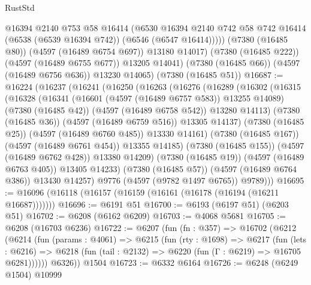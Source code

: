 \begin{lexlean}{RustStd}
\begin{coremodule}
              @16394
              @2140
              @753
              @58
              @16414
              (@6530
                @16394
                @2140
                @742
                @58
                @742
                @16414
                (@6538 (@6539 @16394 @742))
                (@6546 (@6547 @16414)))))
          (@7380 (@16485 @80))
          (@4597 (@16489 @6754 @697))
          @13180
          @14017)
        (@7380 (@16485 @222))
        (@4597 (@16489 @6755 @677))
        @13205
        @14041)
      (@7380 (@16485 @66))
      (@4597 (@16489 @6756 @636))
      @13230
      @14065)
    (@7380 (@16485 @51))
@16687 := @16224
    (@16237
      (@16241
        (@16250
          (@16263
            (@16276
              (@16289
                (@16302
                  (@16315
                    (@16328
                      (@16341
                        (@16601 (@4597 (@16489 @6757 @583)) @13255 @14089)
                        (@7380 (@16485 @42))
                        (@4597 (@16489 @6758 @542))
                        @13280
                        @14113)
                      (@7380 (@16485 @36))
                      (@4597 (@16489 @6759 @516))
                      @13305
                      @14137)
                    (@7380 (@16485 @25))
                    (@4597 (@16489 @6760 @485))
                    @13330
                    @14161)
                  (@7380 (@16485 @167))
                  (@4597 (@16489 @6761 @454))
                  @13355
                  @14185)
                (@7380 (@16485 @155))
                (@4597 (@16489 @6762 @428))
                @13380
                @14209)
              (@7380 (@16485 @19))
              (@4597 (@16489 @6763 @405))
              @13405
              @14233)
            (@7380 (@16485 @57))
            (@4597 (@16489 @6764 @386))
            @13430
            @14257)
          @9776
          (@4597 (@9782 @1497 @6765))
          @9789)))
@16695 := @16096 (@16118 (@16157 (@16159 (@16161 (@16178 (@16194 (@16211 @16687)))))))
@16696 := @6191 @51
@16700 := @6193 (@6197 @51) (@6203 @51)
@16702 := @6208 (@6162 @6209)
@16703 := @4068 @5681
@16705 := @6208 (@16703 @6236)
@16722 := @6207
    (fun (fn : @357) =>
    @16702
      (@6212
        (@6214
          (fun (params : @4061) =>
          @6215
            (fun (rty : @1698) =>
            @6217
              (fun (lets : @6216) =>
              @6218 (fun (tail : @2132) => @6220 (fun (Γ : @6219) => @16705 @6281))))))
        @6326))
    @1504
@16723 := @6332 @6164
@16726 := @6248 (@6249 @1504) @10999

\end{coremodule}
\end{lexlean}
